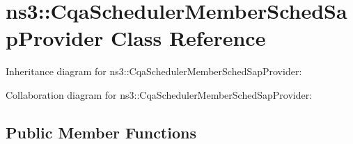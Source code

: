 \hypertarget{classns3_1_1CqaSchedulerMemberSchedSapProvider}{}\section{ns3\+:\+:Cqa\+Scheduler\+Member\+Sched\+Sap\+Provider Class Reference}
\label{classns3_1_1CqaSchedulerMemberSchedSapProvider}


Inheritance diagram for ns3\+:\+:Cqa\+Scheduler\+Member\+Sched\+Sap\+Provider\+:


Collaboration diagram for ns3\+:\+:Cqa\+Scheduler\+Member\+Sched\+Sap\+Provider\+:
\subsection*{Public Member Functions}

